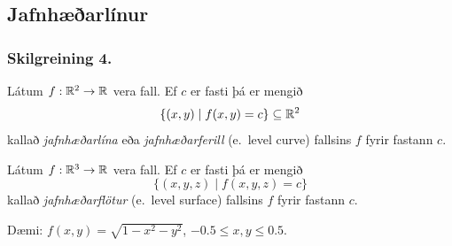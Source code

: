 \begin{figure} [h]
\begin {center}  \end {center}
\end {figure}  



\subsection{Jafnhæðarlínur}
 \subsubsection {Skilgreining 4.}
  Látum $f:{\mathbb R}^2\rightarrow {\mathbb R}$ vera fall.  Ef $c$ er fasti þá er mengið 
$$\{(x,y)\mid f(x,y)=c\}\subseteq {\mathbb R}^2$$
kallað {\em jafnhæðarlína} eða {\em jafnhæðarferill} (e.~level curve) fallsins $f$ fyrir fastann $c$.

 Látum $f:{\mathbb R}^3\rightarrow {\mathbb R}$ vera fall.  Ef $c$ er fasti þá er mengið 
$$\{(x,y,z)\mid f(x,y,z)=c\}$$
kallað {\em jafnhæðarflötur} (e.~level surface)  
fallsins $f$ fyrir fastann $c$.
 


 Dæmi: $f(x,y) = \sqrt{1-x^2-y^2}$, $-0.5\leq x,y\leq 0.5$.         

